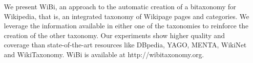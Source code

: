 We present WiBi, an approach to the automatic creation of a bitaxonomy for Wikipedia, that is, an integrated taxonomy of Wikipage pages and categories. We leverage the information available in either one of the taxonomies to reinforce the creation of the other taxonomy. Our experiments show higher quality and coverage than state-of-the-art resources like DBpedia, YAGO, MENTA, WikiNet and WikiTaxonomy. WiBi is available at http://wibitaxonomy.org.
